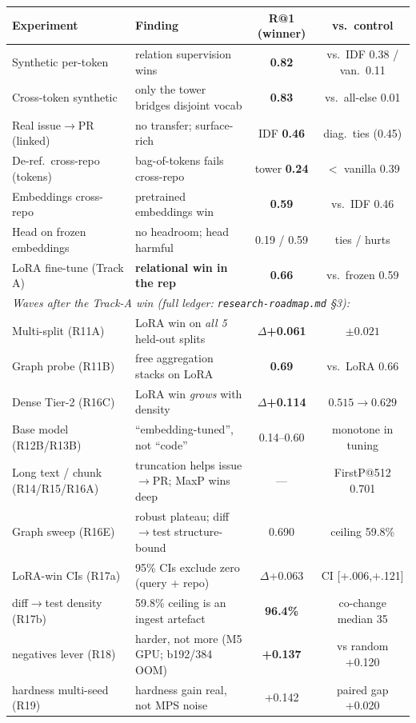 \documentclass[11pt]{article}
\begin{document}
\begin{center}
\begin{tabular}{p{4.6cm}p{4.4cm}cc}
\toprule
Experiment & Finding & R@1 (winner) & vs.\ control \\
\midrule
Synthetic per-token & relation supervision wins & \textbf{0.82} & vs.\ IDF 0.38 / van.\ 0.11 \\
Cross-token synthetic & only the tower bridges disjoint vocab & \textbf{0.83} & vs.\ all-else 0.01 \\
Real issue$\to$PR (linked) & no transfer; surface-rich & IDF \textbf{0.46} & diag.\ ties (0.45) \\
De-ref.\ cross-repo (tokens) & bag-of-tokens fails cross-repo & tower \textbf{0.24} & $<$ vanilla 0.39 \\
Embeddings cross-repo & pretrained embeddings win & \textbf{0.59} & vs.\ IDF 0.46 \\
Head on frozen embeddings & no headroom; head harmful & 0.19 / 0.59 & ties / hurts \\
LoRA fine-tune (Track A) & \textbf{relational win in the rep} & \textbf{0.66} & vs.\ frozen 0.59 \\
\midrule
\multicolumn{4}{l}{\emph{\small Waves after the Track-A win (full ledger: \texttt{research-roadmap.md} \S3):}} \\
Multi-split (R11A) & LoRA win on \emph{all 5} held-out splits & $\Delta$\textbf{+0.061} & $\pm0.021$ \\
Graph probe (R11B) & free aggregation stacks on LoRA & \textbf{0.69} & vs.\ LoRA 0.66 \\
Dense Tier-2 (R16C) & LoRA win \emph{grows} with density & $\Delta$\textbf{+0.114} & $0.515{\to}0.629$ \\
Base model (R12B/R13B) & ``embedding-tuned'', not ``code'' & 0.14--0.60 & monotone in tuning \\
Long text / chunk (R14/R15/R16A) & truncation helps issue$\to$PR; MaxP wins deep & --- & FirstP@512 0.701 \\
Graph sweep (R16E) & robust plateau; diff$\to$test structure-bound & 0.690 & ceiling 59.8\% \\
LoRA-win CIs (R17a) & 95\% CIs exclude zero (query + repo) & $\Delta$+0.063 & CI [+.006,+.121] \\
diff$\to$test density (R17b) & 59.8\% ceiling is an ingest artefact & \textbf{96.4\%} & co-change median 35 \\
negatives lever (R18) & harder, not more (M5 GPU; b192/384 OOM) & \textbf{+0.137} & vs random +0.120 \\
hardness multi-seed (R19) & hardness gain real, not MPS noise & +0.142 & paired gap +0.020 \\
\bottomrule
\end{tabular}
\end{center}
\end{document}
